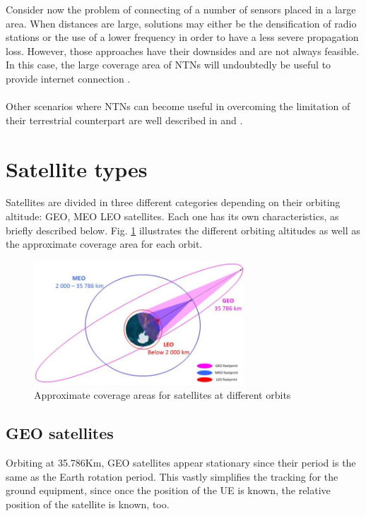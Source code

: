 Consider now the problem of connecting of a number of sensors placed in a large area. When distances are large, solutions may either be the densification of radio stations or the use of a lower frequency in order to have a less severe propagation loss. However, those approaches have their downsides and are not always feasible. In this case, the large coverage area of \ac{NTNs} will undoubtedly be useful to provide internet connection \cite{performance-ntn-support-iot-wang}.

\paragraph{} Other scenarios where \ac{NTNs} can become useful in overcoming the limitation of their terrestrial counterpart are well described in \cite{ntn-6g-era-challenges-giordani} and \cite{potential-multilayered-nierarchical-ntn-wang}.

\section{Satellite types}
\label{sec:satellite-types}
Satellites are divided in three different categories depending on their orbiting altitude: \ac{GEO}, \ac{MEO} \ac{LEO} satellites. Each one has its own characteristics, as briefly described below. Fig. \ref{fig:satellite_coverages} illustrates the different orbiting altitudes as well as the approximate coverage area for each orbit.


\begin{figure}[ht]
    \centering
    \includegraphics[width=0.7\textwidth]{res/satellite-coverages.jpg}
    \caption{Approximate coverage areas for satellites at different orbits\cite{sustainable-sat-com-6g}}
    \label{fig:satellite_coverages}
\end{figure}

\subsection{GEO satellites}
Orbiting at 35.786Km, \ac{GEO} satellites appear stationary since their period is the same as the Earth rotation period. This vastly simplifies the tracking for the ground equipment, since once the position of the \ac{UE} is known, the relative position of the satellite is known, too.

